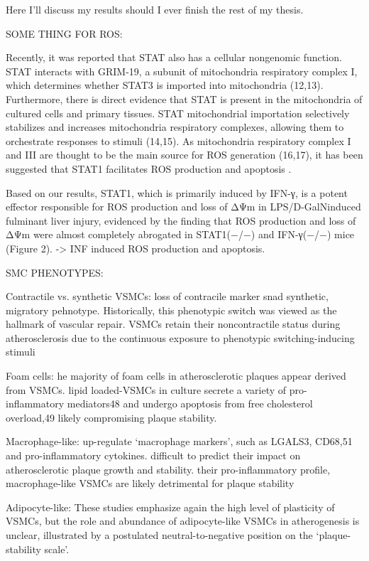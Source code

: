 
Here I'll discuss my results should I ever finish the rest of my thesis.



SOME THING FOR ROS:


    Recently, it was reported that STAT also has a cellular
    nongenomic function. STAT interacts with GRIM-19, a
    subunit of mitochondria respiratory complex I, which determines whether STAT3 is imported into mitochondria (12,13).
    Furthermore, there is direct evidence that STAT is present in
    the mitochondria of cultured cells and primary tissues. STAT
    mitochondrial importation selectively stabilizes and increases
    mitochondria respiratory complexes, allowing them to orchestrate responses to stimuli (14,15). As mitochondria respiratory
    complex I and III are thought to be the main source for ROS
    generation (16,17), it has been suggested that STAT1 facilitates
    ROS production and apoptosis \cite{leeRoleSTAT1IRF12007}. \cite{wangSTATROSCycleExtends2018}

    Based on our results, STAT1, which is primarily induced by IFN-γ, is a potent effector responsible for ROS production and loss of ΔΨm in LPS/D-GalNinduced fulminant liver injury, evidenced by the finding that ROS production and loss of ΔΨm were almost completely abrogated in STAT1(−/−) and IFN-γ(−/−) mice (Figure 2). -> INF induced ROS production and apoptosis.


SMC PHENOTYPES:


Contractile vs. synthetic VSMCs: loss of contracile marker snad synthetic, migratory pehnotype. Historically, this phenotypic switch was viewed as the hallmark of vascular repair. VSMCs retain their noncontractile status during atherosclerosis due to the continuous exposure to phenotypic switching-inducing stimuli

Foam cells: he majority of foam cells in atherosclerotic plaques appear derived from VSMCs. lipid loaded-VSMCs in culture secrete a variety of pro-inflammatory mediators48 and undergo apoptosis from free cholesterol overload,49 likely compromising plaque stability.

Macrophage-like: up-regulate ‘macrophage markers’, such as LGALS3, CD68,51 and pro-inflammatory cytokines. difficult to predict their impact on atherosclerotic plaque growth and stability. their pro-inflammatory profile, macrophage-like VSMCs are likely detrimental for plaque stability

Adipocyte-like: These studies emphasize again the high level of plasticity of VSMCs, but the role and abundance of adipocyte-like VSMCs in atherogenesis is unclear, illustrated by a postulated neutral-to-negative position on the ‘plaque-stability scale’.

